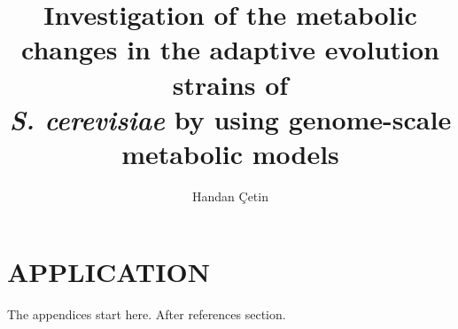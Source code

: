 \documentclass[a4paper,onesided,12pt]{report}
\title{Investigation of the metabolic changes in the adaptive evolution strains of \\
\emph{S. cerevisiae} by using genome-scale metabolic models}
\author{Handan Çetin}
\begin{document}
\makemstitle %
\tableofcontents

%







% 

% 
% 
% 





\appendix
\chapter{APPLICATION}
The appendices start here. After references section.
\end{document}
